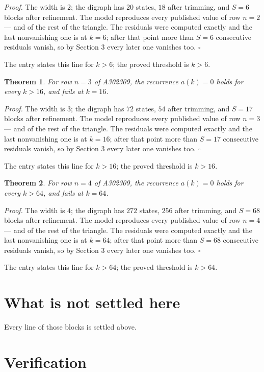 \documentclass[11pt]{article}
\newtheorem{theorem}{Theorem}
\theoremstyle{definition}
\begin{document}
{\itshape Proof.} The width is $2$; the digraph has $20$ states, $18$ after trimming, and $S = 6$ blocks after refinement. The model reproduces every published value of row $n = 2$ --- and of the rest of the triangle. The residuals were computed exactly and the last nonvanishing one is at $k = 6$; after that point more than $S = 6$ consecutive residuals vanish, so by Section 3 every later one vanishes too. $\square$

The entry states this line for $k > 6$; the proved threshold is $k > 6$.

\begin{theorem} For row $n = 3$ of A302309, the recurrence $a(k) = 0$ holds for every $k > 16$, and fails at $k = 16$.\end{theorem}

{\itshape Proof.} The width is $3$; the digraph has $72$ states, $54$ after trimming, and $S = 17$ blocks after refinement. The model reproduces every published value of row $n = 3$ --- and of the rest of the triangle. The residuals were computed exactly and the last nonvanishing one is at $k = 16$; after that point more than $S = 17$ consecutive residuals vanish, so by Section 3 every later one vanishes too. $\square$

The entry states this line for $k > 16$; the proved threshold is $k > 16$.

\begin{theorem} For row $n = 4$ of A302309, the recurrence $a(k) = 0$ holds for every $k > 64$, and fails at $k = 64$.\end{theorem}

{\itshape Proof.} The width is $4$; the digraph has $272$ states, $256$ after trimming, and $S = 68$ blocks after refinement. The model reproduces every published value of row $n = 4$ --- and of the rest of the triangle. The residuals were computed exactly and the last nonvanishing one is at $k = 64$; after that point more than $S = 68$ consecutive residuals vanish, so by Section 3 every later one vanishes too. $\square$

The entry states this line for $k > 64$; the proved threshold is $k > 64$.

\section{What is not settled here}

Every line of those blocks is settled above.

\section{Verification}
\end{document}
